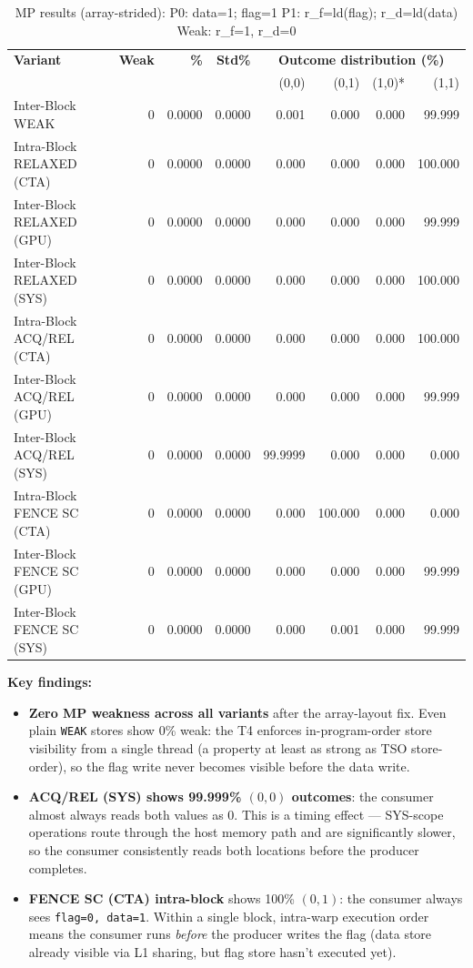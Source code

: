 \documentclass[a4paper]{article}
\begin{document}
\begin{table}[H]
\centering
\small
\caption{MP results (array-strided): P0: data=1; flag=1 \quad P1: r\_f=ld(flag); r\_d=ld(data) \quad Weak: r\_f=1, r\_d=0}
\label{tab:mp-results}
\begin{tabular}{l|r r r | r r r r}
\toprule
\textbf{Variant} & \textbf{Weak} & \textbf{\%} & \textbf{Std\%} & \multicolumn{4}{c}{\textbf{Outcome distribution (\%)}} \\
                 &               &             &                & (0,0) & (0,1) & (1,0)* & (1,1) \\
\midrule
Inter-Block WEAK          & 0 & 0.0000 & 0.0000 & 0.001 & 0.000 & 0.000 & 99.999 \\
Intra-Block RELAXED (CTA) & 0 & 0.0000 & 0.0000 & 0.000 & 0.000 & 0.000 & 100.000 \\
Inter-Block RELAXED (GPU) & 0 & 0.0000 & 0.0000 & 0.000 & 0.000 & 0.000 & 99.999 \\
Inter-Block RELAXED (SYS) & 0 & 0.0000 & 0.0000 & 0.000 & 0.000 & 0.000 & 100.000 \\
Intra-Block ACQ/REL (CTA) & 0 & 0.0000 & 0.0000 & 0.000 & 0.000 & 0.000 & 100.000 \\
Inter-Block ACQ/REL (GPU) & 0 & 0.0000 & 0.0000 & 0.000 & 0.000 & 0.000 & 99.999 \\
Inter-Block ACQ/REL (SYS) & 0 & 0.0000 & 0.0000 & 99.9999 & 0.000 & 0.000 & 0.000 \\
Intra-Block FENCE SC (CTA)& 0 & 0.0000 & 0.0000 & 0.000 & 100.000 & 0.000 & 0.000 \\
Inter-Block FENCE SC (GPU)& 0 & 0.0000 & 0.0000 & 0.000 & 0.000 & 0.000 & 99.999 \\
Inter-Block FENCE SC (SYS)& 0 & 0.0000 & 0.0000 & 0.000 & 0.001 & 0.000 & 99.999 \\
\bottomrule
\end{tabular}
\end{table}

\textbf{Key findings:}
\begin{itemize}
  \item \textbf{Zero MP weakness across all variants} after the array-layout fix.
    Even plain \texttt{WEAK} stores show 0\% weak: the T4 enforces in-program-order store visibility from a single thread (a property at least as strong as TSO store-order), so the flag write never becomes visible before the data write.
  \item \textbf{ACQ/REL (SYS) shows 99.999\% $(0,0)$ outcomes}: the consumer almost always reads both values as 0. This is a timing effect — SYS-scope operations route through the host memory path and are significantly slower, so the consumer consistently reads both locations before the producer completes.
  \item \textbf{FENCE SC (CTA) intra-block} shows 100\% $(0,1)$: the consumer always sees \texttt{flag=0, data=1}. Within a single block, intra-warp execution order means the consumer runs \emph{before} the producer writes the flag (data store already visible via L1 sharing, but flag store hasn't executed yet).
\end{itemize}
\end{document}
